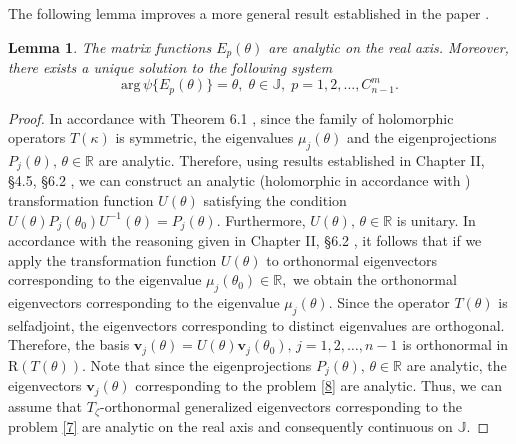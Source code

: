 \documentclass[a4paper,twoside,12pt]{article}
\newtheorem{lemma}{Lemma}
\begin{document}
The following lemma improves a more general result established in the paper \cite{KABaChu26}.



\begin{lemma}\label{L2}
The matrix functions $E_{p}(\theta)$ are analytic on the real axis. Moreover, there exists a unique  solution to the following system
\begin{equation}\label{9}
\mathrm{arg}\, \psi\{E_{p}(\theta)\}=\theta,\;\theta\in \mathbb{J},\;p=1,2,\dots,C_{n-1}^{m}.
\end{equation}
\end{lemma}
\begin{proof}
In accordance with Theorem 6.1 \cite[p.120]{firstab_lit:kato1980}, since the   family  of holomorphic  operators $T (\kappa)$ is symmetric,  the eigenvalues
$\mu_{j} (\theta)$ and the eigenprojections $P_{j} (\theta),\,\theta\in \mathbb{R}$ are analytic.
Therefore, using  results established in  Chapter II, \S 4.5, \S 6.2 \cite[p.121]{firstab_lit:kato1980}, we can
  construct an analytic (holomorphic in accordance with \cite{firstab_lit:kato1980}) transformation function $U (\theta)$  satisfying the   condition $U(\theta)P_{j} (\theta_{0})U^{-1}(\theta)=P_{j} (\theta).$  Furthermore, $U (\theta),\,\theta\in \mathbb{R}$ is unitary.  In accordance with the reasoning  given  in Chapter II, \S 6.2 \cite[p.122]{firstab_lit:kato1980}, it follows that if we apply    the transformation function $U (\theta)$  to   orthonormal  eigenvectors corresponding to the eigenvalue $\mu_{j}(\theta_{0} )\in \mathbb{R},$ we obtain    the orthonormal  eigenvectors corresponding to the eigenvalue $\mu_{j}(\theta).$ Since the operator $T(\theta)$ is selfadjoint, the eigenvectors corresponding to distinct eigenvalues are orthogonal. Therefore, the basis
  $\mathbf{v}_{j}(\theta)=U(\theta)\mathbf{v}_{j}(\theta_{0}),\,j=1,2,\ldots,n-1$ is orthonormal in $\mathrm{R}(T (\theta)).$ Note that since the eigenprojections $P_{j} (\theta),\,\theta\in \mathbb{R}$ are analytic, the eigenvectors    $\mathbf{v}_{j}(\theta)$ corresponding to the  problem \eqref{8} are analytic. Thus, we can assume that  $T_{\zeta}$-orthonormal generalized  eigenvectors corresponding to the  problem  \eqref{7} are analytic on the real axis and consequently continuous on $\mathbb{J}.$





\end{proof}
\end{document}
